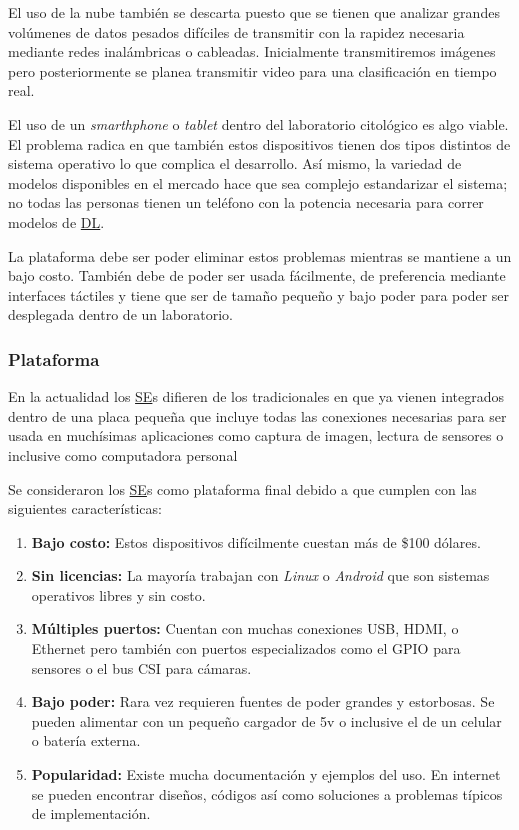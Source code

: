 El uso de la nube también se descarta puesto que se tienen que analizar grandes
volúmenes de datos pesados difíciles de transmitir con la rapidez necesaria
mediante redes inalámbricas o cableadas. Inicialmente transmitiremos imágenes
pero posteriormente se planea transmitir video para una clasificación en tiempo
real.

El uso de un \emph{smarthphone} o \emph{tablet} dentro del laboratorio
citológico es algo viable. El problema radica en que también estos dispositivos
tienen dos tipos distintos de sistema operativo lo que complica el desarrollo.
Así mismo, la variedad de modelos disponibles en el mercado hace que sea
complejo estandarizar el sistema; no todas las personas tienen un teléfono con
la potencia necesaria para correr modelos de \hyperlink{abbr}{DL}. 

La plataforma debe ser poder eliminar estos problemas mientras se mantiene a un
bajo costo. También debe de poder ser usada fácilmente, de preferencia mediante
interfaces táctiles y tiene que ser de tamaño pequeño y bajo poder para poder
ser desplegada dentro de un laboratorio.

\subsubsection{Plataforma}

En la actualidad los \hyperlink{abbr}{SE}s difieren de los tradicionales en que
ya vienen integrados dentro de una placa pequeña que incluye todas las
conexiones necesarias para ser usada en muchísimas aplicaciones como captura de
imagen, lectura de sensores o inclusive como computadora personal

Se consideraron los \hyperlink{abbr}{SE}s como plataforma final debido a que
cumplen con las siguientes características:

\begin{enumerate}
    \item{\textbf{Bajo costo: }} Estos dispositivos difícilmente cuestan más de
    \$100 dólares.
    \item{\textbf{Sin licencias: }} La mayoría trabajan con \emph{Linux} o
    \emph{Android} que son sistemas operativos libres y sin costo.
    \item{\textbf{Múltiples puertos: }} Cuentan con muchas conexiones USB, HDMI,
    o Ethernet pero también con puertos especializados como el GPIO para
    sensores o el bus CSI para cámaras.
    \item{\textbf{Bajo poder: }} Rara vez requieren fuentes de poder grandes y
    estorbosas. Se pueden alimentar con un pequeño cargador de 5v o inclusive el
    de un celular o batería externa.
    \item{\textbf{Popularidad: }} Existe mucha documentación y ejemplos del uso.
    En internet se pueden encontrar diseños, códigos así como soluciones a
    problemas típicos de implementación.
\end{enumerate}

